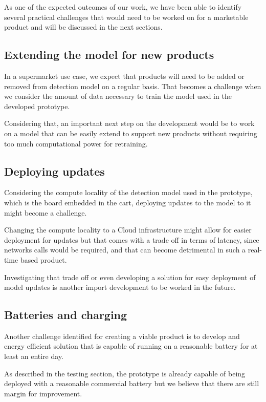 \documentclass[openright]{normas-utf-tex} %
\begin{document}
As one of the expected outcomes of our work, we have been able to identify
several practical challenges that would need to be worked on for a marketable
product and will be discussed in the next sections.

\subsection{Extending the model for new products}
In a supermarket use case, we expect that products will need to be added or
removed from detection model on a regular basis. That becomes a challenge when
we consider the amount of data necessary to train the model used in the
developed prototype.

Considering that, an important next step on the development would be to work on
a model that can be easily extend to support new products without requiring too
much computational power for retraining.

\subsection{Deploying updates}

Considering the compute locality of the detection model used in the prototype,
which is the board embedded in the cart, deploying updates to the model to it
might become a challenge.

Changing the compute locality to  a Cloud infrastructure \cite{Aws2022} might
allow for easier deployment for updates but that comes with a trade off in
terms of latency, since networks calls would be required, and that can become
detrimental in such a real-time based product.

Investigating that trade off or even developing a solution for easy deployment
of model updates is another import development to be worked in the future. 

\subsection{Batteries and charging}

Another challenge identified for creating a viable product is to develop and
energy efficient solution that is capable of running on a reasonable battery
for at least an entire day.

As described in the testing section, the prototype is already capable of being
deployed with a reasonable commercial battery but we believe that there are
still margin for improvement.
\end{document}
